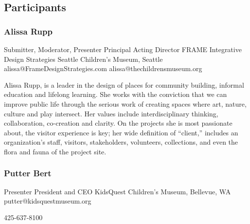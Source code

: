 \documentclass{report}
\begin{document}
            \subsection*{Participants}
              \subsubsection*{ Alissa Rupp }
              Submitter, Moderator, Presenter\newline
              Principal                                                Acting Director\newline
              FRAME Integrative Design Strategies         Seattle Children’s Museum, Seattle
              \newline
              alissa@FrameDesignStrategies.com\newline
              alissa@thechildrensmuseum.org\newline

              Alissa Rupp, is a leader in the design of places for community building, informal education and lifelong learning. She works with the conviction that we can improve public life through the serious work of creating spaces where art, nature, culture and play intersect. Her values include interdisciplinary thinking, collaboration, co-creation and clarity. On the projects she is most passionate about, the visitor experience is key; her wide definition of “client,” includes an organization’s staff, visitors, stakeholders, volunteers, collections, and even the flora and fauna of the project site.\newline


              

              
                \subsubsection*{ Putter Bert }
                Presenter\newline
                President and CEO\newline
                KidsQuest Children’s Museum, Bellevue, WA
                \newline
                putter@kidsquestmuseum.org\newline
                
                425-637-8100\newline
\end{document}
